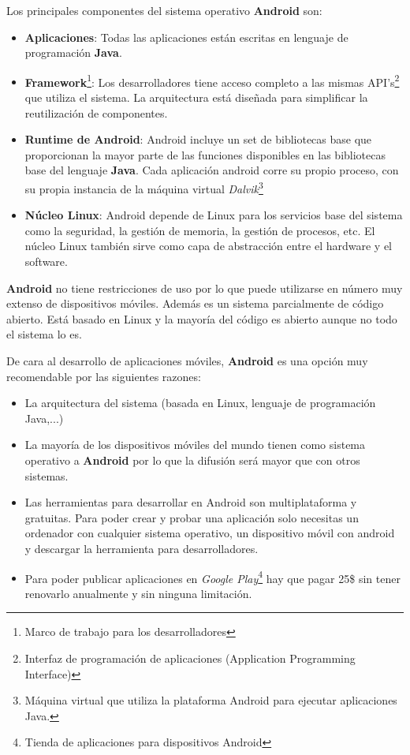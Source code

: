 \bigskip
Los principales componentes del sistema operativo \textbf{Android} son:


\begin{itemize}
  \item \textbf{Aplicaciones}: Todas las aplicaciones están escritas en lenguaje de programación \textbf{Java}.
  \item \textbf{Framework}\footnote{Marco de trabajo para los desarrolladores}: Los desarrolladores tiene acceso completo a las mismas API's\footnote{Interfaz de programación de aplicaciones (Application Programming Interface)} que utiliza el sistema. La arquitectura está diseñada para simplificar la reutilización de componentes.
  \item \textbf{Runtime de Android}: Android incluye un set de bibliotecas base que proporcionan la mayor parte de las funciones disponibles en las bibliotecas base del lenguaje \textbf{Java}. Cada aplicación android corre su propio proceso, con su propia instancia de la máquina virtual \textit{Dalvik}\footnote{Máquina virtual que utiliza la plataforma Android para ejecutar aplicaciones Java.}
  \item \textbf{Núcleo Linux}: Android depende de Linux para los servicios base del sistema como la seguridad, la gestión de memoria, la gestión de procesos, etc. El núcleo Linux también sirve como capa de abstracción entre el hardware y el software.
\end{itemize}

\bigskip
\textbf{Android} no tiene restricciones de uso por lo que puede utilizarse en número muy extenso de dispositivos móviles. Además es un sistema parcialmente de código abierto. Está basado en Linux y la mayoría del código es abierto aunque no todo el sistema lo es.

\bigskip
De cara al desarrollo de aplicaciones móviles, \textbf{Android} es una opción muy recomendable por las siguientes razones:

\begin{itemize}
  \item La arquitectura del sistema (basada en Linux, lenguaje de programación Java,...)
  \item La mayoría de los dispositivos móviles del mundo tienen como sistema operativo a \textbf{Android} por lo que la difusión será mayor que con otros sistemas.
  \item Las herramientas para desarrollar en Android son multiplataforma y gratuitas. Para poder crear y probar una aplicación solo necesitas un ordenador con cualquier sistema operativo, un dispositivo móvil con android y descargar la herramienta para desarrolladores.
  \item Para poder publicar aplicaciones en \textit{Google Play}\footnote{Tienda de aplicaciones para dispositivos Android} hay que pagar 25\$ sin tener renovarlo anualmente y sin ninguna limitación.
\end{itemize}